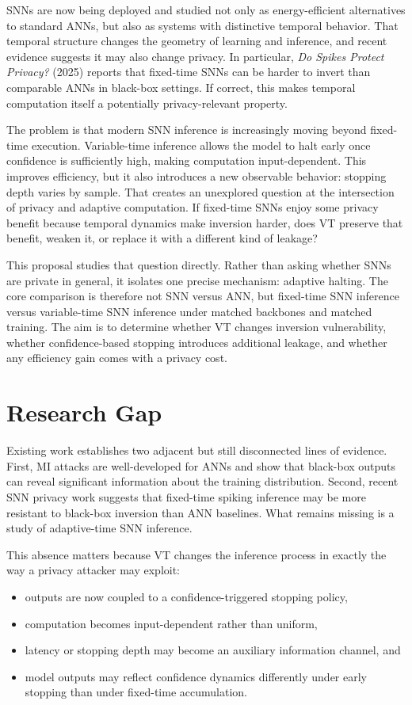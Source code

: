 \documentclass[11pt]{article}
\begin{document}
SNNs are now being deployed and studied not only as energy-efficient alternatives to standard ANNs, but also as systems with distinctive temporal behavior. That temporal structure changes the geometry of learning and inference, and recent evidence suggests it may also change privacy. In particular, \textit{Do Spikes Protect Privacy?} (2025) reports that fixed-time SNNs can be harder to invert than comparable ANNs in black-box settings. If correct, this makes temporal computation itself a potentially privacy-relevant property.

The problem is that modern SNN inference is increasingly moving beyond fixed-time execution. Variable-time inference allows the model to halt early once confidence is sufficiently high, making computation input-dependent. This improves efficiency, but it also introduces a new observable behavior: stopping depth varies by sample. That creates an unexplored question at the intersection of privacy and adaptive computation. If fixed-time SNNs enjoy some privacy benefit because temporal dynamics make inversion harder, does VT preserve that benefit, weaken it, or replace it with a different kind of leakage?

This proposal studies that question directly. Rather than asking whether SNNs are private in general, it isolates one precise mechanism: adaptive halting. The core comparison is therefore not SNN versus ANN, but fixed-time SNN inference versus variable-time SNN inference under matched backbones and matched training. The aim is to determine whether VT changes inversion vulnerability, whether confidence-based stopping introduces additional leakage, and whether any efficiency gain comes with a privacy cost.

\section{Research Gap}
Existing work establishes two adjacent but still disconnected lines of evidence. First, MI attacks are well-developed for ANNs and show that black-box outputs can reveal significant information about the training distribution. Second, recent SNN privacy work suggests that fixed-time spiking inference may be more resistant to black-box inversion than ANN baselines. What remains missing is a study of adaptive-time SNN inference.

This absence matters because VT changes the inference process in exactly the way a privacy attacker may exploit:
\begin{itemize}[leftmargin=1.3em]
\item outputs are now coupled to a confidence-triggered stopping policy,
\item computation becomes input-dependent rather than uniform,
\item latency or stopping depth may become an auxiliary information channel, and
\item model outputs may reflect confidence dynamics differently under early stopping than under fixed-time accumulation.
\end{itemize}
\end{document}
